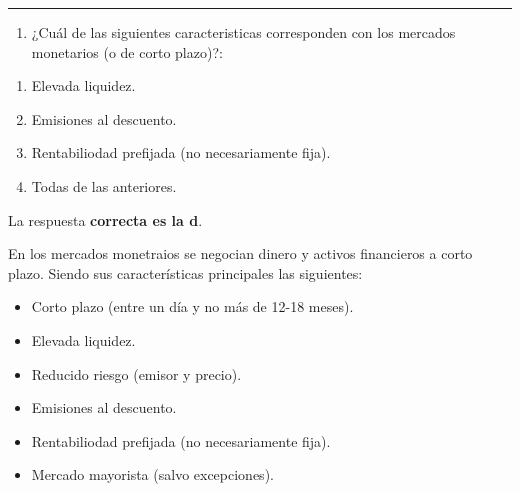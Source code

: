 \documentclass[
  letterpaper,
  DIV=11,
  numbers=noendperiod]{scrreprt}
\providecommand{\tightlist}{%
  \setlength{\itemsep}{0pt}\setlength{\parskip}{0pt}}\usepackage{longtable,booktabs,array}
\begin{document}
\begin{center}\rule{0.5\linewidth}{0.5pt}\end{center}

\begin{enumerate}
\def\labelenumi{\arabic{enumi}.}
\setcounter{enumi}{52}
\tightlist
\item
  ¿Cuál de las siguientes caracteristicas corresponden con los mercados
  monetarios (o de corto plazo)?:
\end{enumerate}

\begin{enumerate}
\def\labelenumi{\alph{enumi}.}
\item
  Elevada liquidez.
\item
  Emisiones al descuento.
\item
  Rentabiliodad prefijada (no necesariamente fija).
\item
  Todas de las anteriores.
\end{enumerate}

\begin{tcolorbox}[enhanced jigsaw, left=2mm, opacityback=0, colback=white, breakable, arc=.35mm, bottomrule=.15mm, rightrule=.15mm, toprule=.15mm, leftrule=.75mm, colframe=quarto-callout-tip-color-frame]
\begin{minipage}[t]{5.5mm}
\textcolor{quarto-callout-tip-color}{\faLightbulb}
\end{minipage}%
\begin{minipage}[t]{\textwidth - 5.5mm}

La respuesta \textbf{correcta es la d}.

En los mercados monetraios se negocian dinero y activos financieros a
corto plazo. Siendo sus características principales las siguientes:

\begin{itemize}
\item
  Corto plazo (entre un día y no más de 12-18 meses).
\item
  Elevada liquidez.
\item
  Reducido riesgo (emisor y precio).
\item
  Emisiones al descuento.
\item
  Rentabiliodad prefijada (no necesariamente fija).
\item
  Mercado mayorista (salvo excepciones).
\end{itemize}

\end{minipage}%
\end{tcolorbox}
\end{document}
